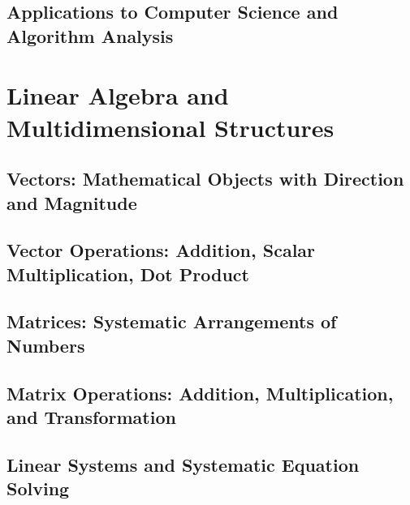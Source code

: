 \documentclass[12pt, oneside, openany]{book}
\let\oldchapter\chapter
\renewcommand{\chapter}{
	\cleardoublepage
	\thispagestyle{chapter}
	\oldchapter
}
\begin{document}
\section{Applications to Computer Science and Algorithm Analysis}


\chapter{Linear Algebra and Multidimensional Structures}

\section{Vectors: Mathematical Objects with Direction and Magnitude}

\section{Vector Operations: Addition, Scalar Multiplication, Dot Product}

\section{Matrices: Systematic Arrangements of Numbers}

\section{Matrix Operations: Addition, Multiplication, and Transformation}

\section{Linear Systems and Systematic Equation Solving}
\end{document}
